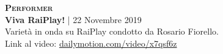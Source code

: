 \textbf{\textsc{Performer}} \\
\textbf{Viva RaiPlay!} | 22 Novembre 2019 \\
Varietà in onda su RaiPlay condotto da Rosario Fiorello. \\
Link al video: \href{https://www.dailymotion.com/video/x7qsf6z}{dailymotion.com/video/x7qsf6z}
\begin{center}
    \label{fig:vivaraiplay}	
\end{center}
